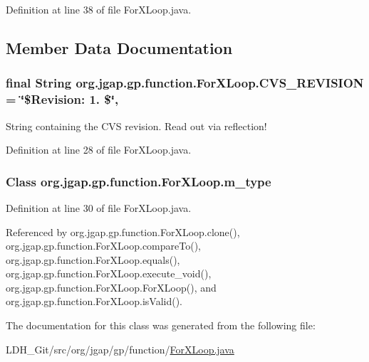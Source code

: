 Definition at line 38 of file For\-X\-Loop.\-java.



\subsection{Member Data Documentation}
\hypertarget{classorg_1_1jgap_1_1gp_1_1function_1_1_for_x_loop_a616805f26502d9bceac6b04bf3991c94}{
\subsubsection[{C\-V\-S\-\_\-\-R\-E\-V\-I\-S\-I\-O\-N}]{\setlength{\rightskip}{0pt plus 5cm}final String org.\-jgap.\-gp.\-function.\-For\-X\-Loop.\-C\-V\-S\-\_\-\-R\-E\-V\-I\-S\-I\-O\-N = \char`\"{}\$Revision\-: 1. \$\char`\"{}\hspace{0.3cm}{\ttfamily [static]}, {\ttfamily [private]}}}\label{classorg_1_1jgap_1_1gp_1_1function_1_1_for_x_loop_a616805f26502d9bceac6b04bf3991c94}
String containing the C\-V\-S revision. Read out via reflection! 

Definition at line 28 of file For\-X\-Loop.\-java.

\hypertarget{classorg_1_1jgap_1_1gp_1_1function_1_1_for_x_loop_a5cdee676ccb308f19bbbf2c6a14f4dee}{
\subsubsection[{m\-\_\-type}]{\setlength{\rightskip}{0pt plus 5cm}Class org.\-jgap.\-gp.\-function.\-For\-X\-Loop.\-m\-\_\-type\hspace{0.3cm}{\ttfamily [private]}}}\label{classorg_1_1jgap_1_1gp_1_1function_1_1_for_x_loop_a5cdee676ccb308f19bbbf2c6a14f4dee}


Definition at line 30 of file For\-X\-Loop.\-java.



Referenced by org.\-jgap.\-gp.\-function.\-For\-X\-Loop.\-clone(), org.\-jgap.\-gp.\-function.\-For\-X\-Loop.\-compare\-To(), org.\-jgap.\-gp.\-function.\-For\-X\-Loop.\-equals(), org.\-jgap.\-gp.\-function.\-For\-X\-Loop.\-execute\-\_\-void(), org.\-jgap.\-gp.\-function.\-For\-X\-Loop.\-For\-X\-Loop(), and org.\-jgap.\-gp.\-function.\-For\-X\-Loop.\-is\-Valid().



The documentation for this class was generated from the following file\-:\begin{DoxyCompactItemize}
\item 
L\-D\-H\-\_\-\-Git/src/org/jgap/gp/function/\hyperlink{_for_x_loop_8java}{For\-X\-Loop.\-java}\end{DoxyCompactItemize}
